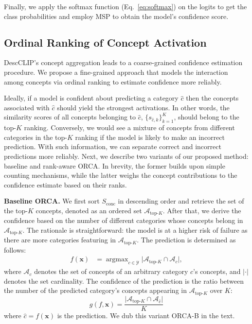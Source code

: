 Finally, we apply the softmax function (Eq.~\ref{eq:softmax}) on the logits to get the class probabilities and employ MSP to obtain the model's confidence score.

\subsection{Ordinal Ranking of Concept Activation}

DescCLIP's concept aggregation leads to a coarse-grained confidence estimation procedure. We propose a fine-grained approach that models the interaction among concepts via ordinal ranking to estimate confidence more reliably. 

Ideally, if a model is confident about predicting a category $\hat{c}$ then the concepts associated with $\hat{c}$ should yield the strongest activations. 
In other words, the similarity scores of all concepts belonging to $\hat{c}$, $\{s_{\hat{c}, k}\}_{k=1}^K$, should belong to the top-$K$ ranking.
Conversely, we would see a mixture of concepts from different categories in the top-$K$ ranking if the model is likely to make an incorrect prediction. 
With such information, we can separate correct and incorrect predictions more reliably.
Next, we describe two variants of our proposed method: baseline and rank-aware ORCA.
In brevity, the former builds upon simple counting mechanisms, while the latter weighs the concept contributions to the confidence estimate based on their ranks.

\vspace{5pt}
\noindent\textbf{Baseline ORCA.}
We first sort $S_{\text{conc}}$ in descending order and retrieve the set of the top-$K$ concepts, denoted as an ordered set $\mathcal{A}_{\text{top-}K}$.
After that, we derive the confidence based on the number of different categories whose concepts belong in $\mathcal{A}_{\text{top-}K}$.
The rationale is straightforward: the model is at a higher risk of failure as there are more categories featuring in $\mathcal{A}_{\text{top-}K}$.
The prediction is determined as follows:
\begin{equation} \label{eq:orca-b-pred}
    \begin{aligned}
    f(\mathbf{x}) &= \operatorname{argmax}_{c\in\mathcal{Y}} \lvert \mathcal{A}_{\text{top-}K} \cap \mathcal{A}_c \rvert,
\end{aligned}
\end{equation}
where $\mathcal{A}_c$ denotes the set of concepts of an arbitrary category $c$'s concepts, and $\lvert \cdot \rvert$ denotes the set cardinality.
The confidence of the prediction is the ratio between the number of the predicted category's concepts appearing in $\mathcal{A}_{\text{top-}K}$ over $K$:
\begin{equation} \label{eq:orca-b-conf}
    g(f, \mathbf{x}) = \frac{\lvert \mathcal{A}_{\text{top-}K} \cap \mathcal{A}_{\hat{c}}\rvert}{K} 
\end{equation}
where $\hat{c} = f(\mathbf{x})$ is the prediction. 
We dub this variant ORCA-B in the text.

